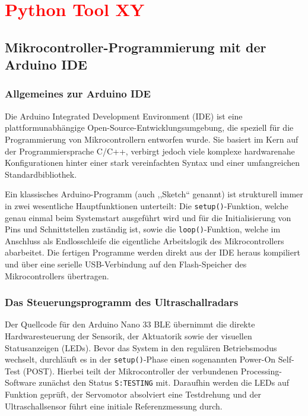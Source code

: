 %
%
%


\chapter{\textcolor{red}{Python Tool XY}}

\section{Mikrocontroller-Programmierung mit der Arduino IDE}

\subsection{Allgemeines zur Arduino IDE}
Die Arduino Integrated Development Environment (IDE) ist eine plattformunabhängige Open-Source-Entwicklungsumgebung, die speziell für die Programmierung von Mikrocontrollern entworfen wurde. Sie basiert im Kern auf der Programmiersprache C/C++, verbirgt jedoch viele komplexe hardwarenahe Konfigurationen hinter einer stark vereinfachten Syntax und einer umfangreichen Standardbibliothek. 

Ein klassisches Arduino-Programm (auch ,,Sketch`` genannt) ist strukturell immer in zwei wesentliche Hauptfunktionen unterteilt: Die \texttt{setup()}-Funktion, welche genau einmal beim Systemstart ausgeführt wird und für die Initialisierung von Pins und Schnittstellen zuständig ist, sowie die \texttt{loop()}-Funktion, welche im Anschluss als Endlosschleife die eigentliche Arbeitslogik des Mikrocontrollers abarbeitet. Die fertigen Programme werden direkt aus der IDE heraus kompiliert und über eine serielle USB-Verbindung auf den Flash-Speicher des Mikrocontrollers übertragen.

\subsection{Das Steuerungsprogramm des Ultraschallradars}
Der Quellcode für den Arduino Nano 33 BLE übernimmt die direkte Hardwaresteuerung der Sensorik, der Aktuatorik sowie der visuellen Statusanzeigen (LEDs). Bevor das System in den regulären Betriebsmodus wechselt, durchläuft es in der \texttt{setup()}-Phase einen sogenannten Power-On Self-Test (POST). Hierbei teilt der Mikrocontroller der verbundenen Processing-Software zunächst den Status \texttt{S:TESTING} mit. Daraufhin werden die LEDs auf Funktion geprüft, der Servomotor absolviert eine Testdrehung und der Ultraschallsensor führt eine initiale Referenzmessung durch. 

